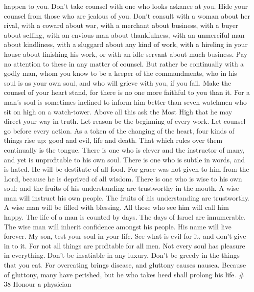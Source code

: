 happen to you.  Don't take counsel with one who looks
askance at you. Hide your counsel from those who are jealous of you.
 Don't consult with a woman about her rival, with a coward
about war, with a merchant about business, with a buyer about selling,
with an envious man about thankfulness, with an unmerciful man about
kindliness, with a sluggard about any kind of work, with a hireling in
your house about finishing his work, or with an idle servant about much
business. Pay no attention to these in any matter of counsel.
 But rather be continually with a godly man, whom you know
to be a keeper of the commandments, who in his soul is as your own soul,
and who will grieve with you, if you fail.  Make the
counsel of your heart stand, for there is no one more faithful to you
than it.  For a man's soul is sometimes inclined to inform
him better than seven watchmen who sit on high on a watch-tower.
 Above all this ask the Most High that he may direct your
way in truth.  Let reason be the beginning of every work.
Let counsel go before every action.  As a token of the
changing of the heart,  four kinds of things rise up: good
and evil, life and death. That which rules over them continually is the
tongue.  There is one who is clever and the instructor of
many, and yet is unprofitable to his own soul.  There is
one who is subtle in words, and is hated. He will be destitute of all
food.  For grace was not given to him from the Lord,
because he is deprived of all wisdom.  There is one who is
wise to his own soul; and the fruits of his understanding are
trustworthy in the mouth.  A wise man will instruct his own
people. The fruits of his understanding are trustworthy.  A
wise man will be filled with blessing. All those who see him will call
him happy.  The life of a man is counted by days. The days
of Israel are innumerable.  The wise man will inherit
confidence amongst his people. His name will live forever. 
My son, test your soul in your life. See what is evil for it, and don't
give in to it.  For not all things are profitable for all
men. Not every soul has pleasure in everything.  Don't be
insatiable in any luxury. Don't be greedy in the things that you eat.
 For overeating brings disease, and gluttony causes nausea.
 Because of gluttony, many have perished, but he who takes
heed shall prolong his life. \# 38  Honour a physician
